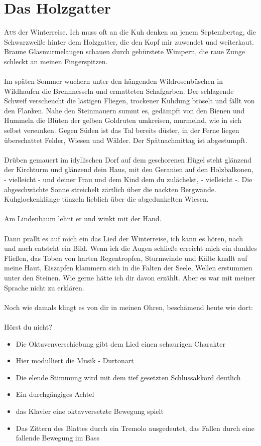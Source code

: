 \chapter{Das Holzgatter}
\lettrine{A}{us} der Winterreise. Ich muss oft an die Kuh denken an jenem Septembertag, die Schwarzweiße hinter dem Holzgatter, die den Kopf mir zuwendet und weiterkaut. Braune Glasmurmelaugen schauen durch gebürstete Wimpern, die raue Zunge schleckt an meinen Fingerspitzen. \\\\
Im späten Sommer wuchern unter den hängenden Wildrosenbüschen in Wildhaufen die Brennnesseln und ermatteten Schafgarben. Der schlagende Schweif verscheucht die lästigen Fliegen, trockener Kuhdung bröselt und fällt von den Flanken. Nahe den Steinmauern summt es, gedämpft von den Bienen und Hummeln die Blüten der gelben Goldruten umkreisen, murmelnd, wie in sich selbst versunken. Gegen Süden ist das Tal bereits düster, in der Ferne liegen überschattet Felder, Wiesen und Wälder. Der Spätnachmittag ist abgestumpft. \\\\
Drüben gemauert im idyllischen Dorf auf dem geschorenen Hügel steht glänzend der Kirchturm und glänzend dein Haus, mit den Geranien auf den Holzbalkonen, -  vielleicht -  und deiner Frau und dem Kind dem du zulächelst, - vielleicht -. Die abgeschwächte Sonne streichelt zärtlich über die nackten Bergwände. Kuhglockenklänge tänzeln lieblich über die abgedunkelten Wiesen.\\\\
Am Lindenbaum lehnt er und winkt mit der Hand.\\\\
Dann prallt es auf mich ein das Lied der Winterreise, ich kann es hören, nach und nach entsteht ein Bild. Wenn ich die Augen schließe erreicht mich ein dunkles Fließen, das Toben von harten Regentropfen, Sturmwinde und Kälte knallt auf meine Haut, Eiszapfen klammern sich in die Falten der Seele, Wellen erstummen unter den Steinen. Wie gerne hätte ich dir davon erzählt. Aber es war mit meiner Sprache nicht zu erklären. \\\\
Noch wie damals klingt es von dir in meinen Ohren, beschämend heute wie dort: \\\\
Hörst du nicht?\\
\begin{itemize}
	\item Die Oktavenverschiebung gibt dem Lied einen schaurigen Charakter
	\item Hier modulliert die Musik  - Durtonart
	\item Die elende Stimmung wird mit dem tief gesetzten Schlussakkord deutlich
	\item Ein durchgängiges Achtel
	\item das Klavier eine oktavversetzte Bewegung spielt
	\item Das Zittern des Blattes durch ein Tremolo ausgedeutet, das Fallen durch eine fallende Bewegung im Bass
\end{itemize}

